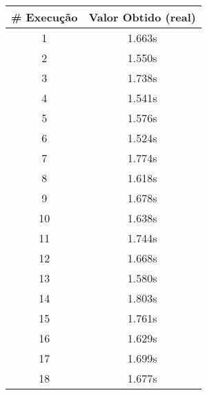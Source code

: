 \documentclass[11pt]{article}
\begin{document}
\begin{table}[!h]
\begin{center}
\begin{minipage}{0.48\textwidth}
\begin{tabular}{| c | c |}
			\hline
				\textbf{\# Execução} &  \textbf{Valor Obtido (real)} \\ \hline
				1 & 1.663s \\ \hline
				2 & 1.550s \\ \hline
				3 & 1.738s \\ \hline
				4 & 1.541s \\ \hline
				5 & 1.576s \\ \hline
				6 & 1.524s \\ \hline
				7 & 1.774s \\ \hline
				8 & 1.618s \\ \hline
				9 & 1.678s \\ \hline
				10 & 1.638s \\ \hline
				11 & 1.744s \\ \hline
				12 & 1.668s \\ \hline
				13 & 1.580s \\ \hline
				14 & 1.803s \\ \hline
				15 & 1.761s \\ \hline
				16 & 1.629s \\ \hline
				17 & 1.699s \\ \hline
				18 & 1.677s \\ \hline
			\end{tabular}
		\end{minipage}
	\end{center}
\end{table}
\end{document}
